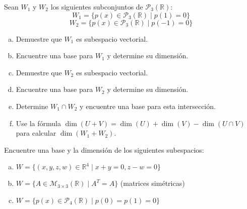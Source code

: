 \begin{prob} Sean $W_1$ y $W_2$ los siguientes subconjuntos de $\mathcal{P}_3(\mathbb{R})$:
$$W_1 = \{p(x) \in \mathcal{P}_3(\mathbb{R}) \mid p(1) = 0\}$$
$$W_2 = \{p(x) \in \mathcal{P}_3(\mathbb{R}) \mid p(-1) = 0\}$$

\begin{enumerate}[(a)]
\item Demuestre que $W_1$ es subespacio vectorial.
\item Encuentre una base para $W_1$ y determine su dimensión.
\item Demuestre que $W_2$ es subespacio vectorial.
\item Encuentre una base para $W_2$ y determine su dimensión.
\item Determine $W_1 \cap W_2$ y encuentre una base para esta intersección.
\item Use la fórmula $\dim(U + V) = \dim(U) + \dim(V) - \dim(U \cap V)$ para calcular $\dim(W_1 + W_2)$.
\end{enumerate}
\end{prob}

\begin{prob} Encuentre una base y la dimensión de los siguientes subespacios:
\begin{enumerate}[(a)]
\item $W = \{(x, y, z, w) \in \mathbb{R}^4 \mid x + y = 0, z - w = 0\}$
\item $W = \{A \in \mathcal{M}_{3 \times 3}(\mathbb{R}) \mid A^T = A\}$ (matrices simétricas)
\item $W = \{p(x) \in \mathcal{P}_4(\mathbb{R}) \mid p(0) = p(1) = 0\}$
\end{enumerate}
\end{prob}



